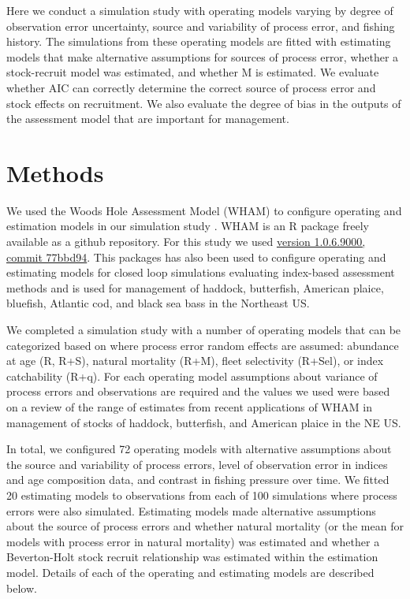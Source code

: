 \documentclass[
  12pt,
]{article}
\begin{document}
Here we conduct a simulation study with operating models varying by
degree of observation error uncertainty, source and variability of
process error, and fishing history. The simulations from these operating
models are fitted with estimating models that make alternative
assumptions for sources of process error, whether a stock-recruit model
was estimated, and whether M is estimated. We evaluate whether AIC can
correctly determine the correct source of process error and stock
effects on recruitment. We also evaluate the degree of bias in the
outputs of the assessment model that are important for management.

\hypertarget{methods}{%
\section*{Methods}\label{methods}}

We used the Woods Hole Assessment Model (WHAM) to configure operating
and estimation models in our simulation study \citep[]{stockmiller21}.
WHAM is an R package freely available as a github repository. For this
study we used
\href{https://github.com/timjmiller/wham/tree/77bbd946e4881216a439933473d1c58b21c270c3}{version
1.0.6.9000, commit 77bbd94}. This packages has also been used to
configure operating and estimating models for closed loop simulations
evaluating index-based assessment methods \citep{legaultetal23} and is
used for management of haddock, butterfish, American plaice, bluefish,
Atlantic cod, and black sea bass in the Northeast US.

We completed a simulation study with a number of operating models that
can be categorized based on where process error random effects are
assumed: abundance at age (R, R+S), natural mortality (R+M), fleet
selectivity (R+Sel), or index catchability (R+q). For each operating
model assumptions about variance of process errors and observations are
required and the values we used were based on a review of the range of
estimates from recent applications of WHAM in management of stocks of
haddock, butterfish, and American plaice in the NE US.

In total, we configured 72 operating models with alternative assumptions
about the source and variability of process errors, level of observation
error in indices and age composition data, and contrast in fishing
pressure over time. We fitted 20 estimating models to observations from
each of 100 simulations where process errors were also simulated.
Estimating models made alternative assumptions about the source of
process errors and whether natural mortality (or the mean for models
with process error in natural mortality) was estimated and whether a
Beverton-Holt stock recruit relationship was estimated within the
estimation model. Details of each of the operating and estimating models
are described below.
\end{document}
